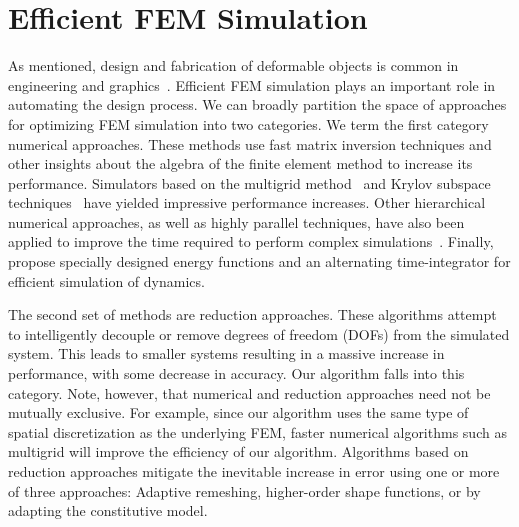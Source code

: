 \section{Efficient FEM Simulation}
As mentioned, design and fabrication of deformable objects is common in
engineering and graphics~\citep{bendsoe2004topology,Kou2012,McAdams2011}.
Efficient FEM simulation plays an important role in automating the design process.
We can broadly partition the space of approaches for
optimizing FEM simulation into two categories. We term the first
category numerical approaches. These methods use fast matrix inversion
techniques and other insights about the algebra of the finite
element method to increase its performance. Simulators based on
the multigrid method~\citep{Peraire1992,Zhu2010,McAdams2011}
and Krylov subspace techniques~\citep{Patterson2012}
have yielded impressive performance increases. Other hierarchical
numerical approaches, as well as highly parallel techniques, have
also been applied to improve the time required to perform complex
simulations~\citep{Farhat1991,Mandel1993}. Finally, \citet{Bouaziz:2014} propose specially designed energy functions and an
alternating time-integrator for efficient simulation of dynamics.

The second set of methods are reduction approaches. These algorithms
attempt to intelligently decouple or remove degrees of
freedom (DOFs) from the simulated system. This leads to smaller
systems resulting in a massive increase in performance, with some
decrease in accuracy. Our algorithm falls into this category. Note,
however, that numerical and reduction approaches need not be mutually exclusive.
For example, since our algorithm uses the same type of spatial discretization as the underlying FEM,
faster numerical algorithms such as multigrid will improve the efficiency of our algorithm.
Algorithms based on reduction approaches mitigate the inevitable increase in error using
one or more of three approaches: Adaptive remeshing, higher-order
shape functions, or by adapting the constitutive model.

